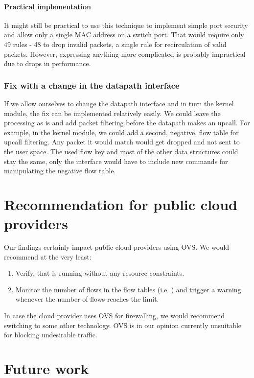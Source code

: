 \paragraph{Practical implementation}
It might still be practical to use this technique to implement simple port security and allow only a single MAC address on a switch port. That would require only 49 rules - 48 to drop invalid packets, a single rule for recirculation of valid packets. However, expressing anything more complicated is probably impractical due to drops in performance.

\subsubsection{Fix with a change in the datapath interface}

If we allow ourselves to change the datapath interface and in turn the kernel module, the fix can be implemented relatively easily. We could leave the processing as is and add packet filtering before the datapath makes an upcall. For example, in the kernel module, we could add a second, negative, flow table for upcall filtering. Any packet it would match would get dropped and not sent to the user space. The used flow key and most of the other data structures could stay the same, only the interface would have to include new commands for manipulating the negative flow table.


\section{Recommendation for public cloud providers}

Our findings certainly impact public cloud providers using OVS. We would recommend at the very least:

\begin{enumerate}
    \item Verify, that  is running without any resource constraints.
    \item Monitor the number of flows in the flow tables (i.e. ) and trigger a warning whenever the number of flows reaches the limit.
\end{enumerate}

In case the cloud provider uses OVS for firewalling, we would recommend switching to some other technology. OVS is in our opinion currently unsuitable for blocking undesirable traffic.


\section{Future work}

